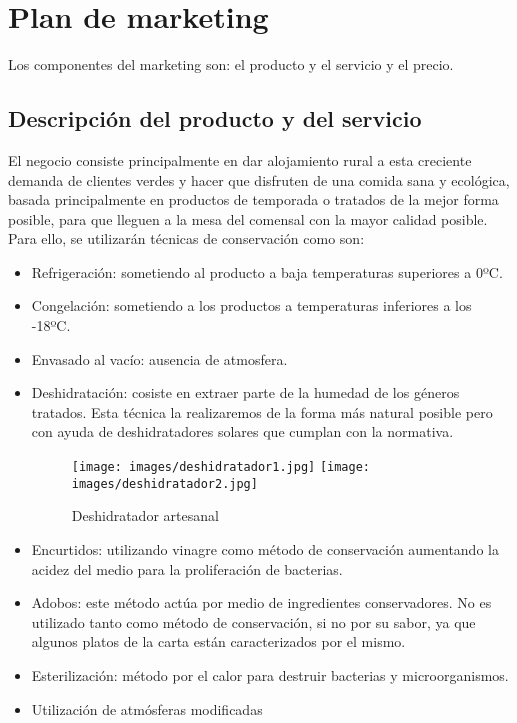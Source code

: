 \chapter{Plan de marketing}
\label{chap:marketing}

Los componentes del marketing son: el producto y el servicio y el precio. 

\section{Descripción del producto y del servicio}
\label{sec:desProduct}

El negocio consiste principalmente en dar alojamiento rural a esta creciente demanda de clientes verdes y hacer que disfruten de una comida sana y ecológica, basada principalmente en productos de temporada o tratados de la mejor forma posible, para que lleguen a la mesa del comensal con la mayor calidad posible. Para ello, se utilizarán técnicas de conservación como son: 

\begin{itemize}
\item Refrigeración: sometiendo al producto a baja temperaturas superiores a 0ºC.
\item Congelación: sometiendo a los productos a temperaturas inferiores a los -18ºC.
\item Envasado al vacío: ausencia de atmosfera.
\item Deshidratación: cosiste en extraer parte de la humedad de los géneros tratados. Esta técnica la realizaremos de la forma más natural posible pero con ayuda de deshidratadores solares que cumplan con la normativa.

\begin{figure}[h]
  \begin{center}
    \texttt{[image: images/deshidratador1.jpg]}
    \texttt{[image: images/deshidratador2.jpg]}
    \caption{Deshidratador artesanal}
    \label{fig:deshidratador}
  \end{center}
\end{figure}

\item Encurtidos: utilizando vinagre como método de conservación aumentando la acidez del medio para la proliferación de bacterias.
\item Adobos: este método actúa por medio de ingredientes conservadores. No es utilizado tanto como método de conservación, si no por su sabor, ya que algunos platos de la carta están caracterizados por el mismo.
\item Esterilización: método por el calor para destruir bacterias y microorganismos.
\item Utilización de atmósferas modificadas 
\end{itemize}

